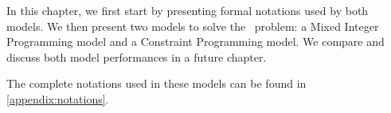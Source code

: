 \documentclass[../../thesis.tex]{subfiles}
\begin{document}
In this chapter, we first start by presenting formal notations used by both models. 
We then present two models to solve the \vone\ problem: a Mixed Integer Programming model and a Constraint Programming model.
We compare and discuss both model performances in a future chapter.

The complete notations used in these models can be found in \autoref{appendix:notations}.
\end{document}
